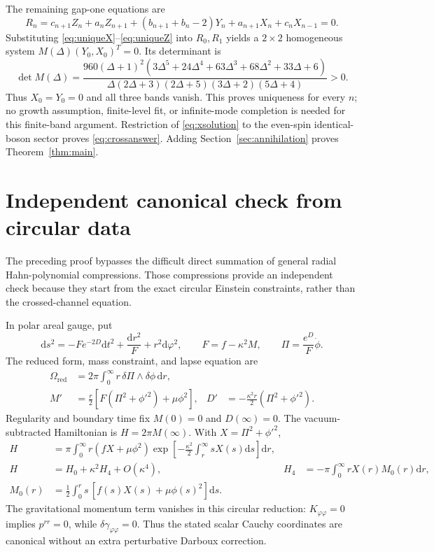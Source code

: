 \documentclass[11pt,a4paper]{article}
\numberwithin{equation}{section}
\theoremstyle{remark}\newtheorem{remark}[theorem]{Remark}
\newcommand{\dd}{\mathrm d}
\newcommand{\kap}{\kappa}
\begin{document}
The remaining gap-one equations are
\begin{equation}
 R_n=c_{n+1}Z_n+a_nZ_{n+1}+(b_{n+1}+b_n-2)Y_n
 +a_{n+1}X_n+c_nX_{n-1}=0.
 \label{eq:uniqueR}
\end{equation}
Substituting \eqref{eq:uniqueX}--\eqref{eq:uniqueZ} into $R_0,R_1$ yields a $2\times2$ homogeneous system $M(\Delta)(Y_0,X_0)^T=0$. Its determinant is
\begin{equation}
 \boxed{\det M(\Delta)=
 \frac{960(\Delta+1)^2
 (3\Delta^5+24\Delta^4+63\Delta^3+68\Delta^2+33\Delta+6)}
 {\Delta(2\Delta+3)(2\Delta+5)(3\Delta+2)(5\Delta+4)}>0.}
 \label{eq:det}
\end{equation}
Thus $X_0=Y_0=0$ and all three bands vanish. This proves uniqueness for every $n$; no growth assumption, finite-level fit, or infinite-mode completion is needed for this finite-band argument. Restriction of \eqref{eq:xsolution} to the even-spin identical-boson sector proves \eqref{eq:crossanswer}. Adding Section~\ref{sec:annihilation} proves Theorem~\ref{thm:main}.

\section{Independent canonical check from circular data}
\label{sec:circular}

The preceding proof bypasses the difficult direct summation of general radial Hahn-polynomial compressions. Those compressions provide an independent check because they start from the exact circular Einstein constraints, rather than the crossed-channel equation.

In polar areal gauge, put
\begin{equation}
 \dd s^2=-Fe^{-2D}\dd t^2+\frac{\dd r^2}{F}+r^2\dd\varphi^2,
 \qquad F=f-\kap^2M,\qquad \Pi=\frac{e^D}{F}\dot\phi.
\end{equation}
The reduced form, mass constraint, and lapse equation are
\begin{align}
 \Omega_{\mathrm{red}}&=2\pi\int_0^\infty r\,\delta\Pi\wedge\delta\phi\,\dd r,\\
 M'&=\frac r2\left[F(\Pi^2+\phi'^2)+\mu\phi^2\right],&
 D'&=-\frac{\kap^2r}{2}(\Pi^2+\phi'^2).
\end{align}
Regularity and boundary time fix $M(0)=0$ and $D(\infty)=0$. The vacuum-subtracted Hamiltonian is $H=2\pi M(\infty)$. With $X=\Pi^2+\phi'^2$,
\begin{align}
 H&=\pi\int_0^\infty\!r(fX+\mu\phi^2)
 \exp\!\left[-\frac{\kap^2}{2}\int_r^\infty\!sX(s)\dd s\right]\dd r,\\
 H&=H_0+\kap^2H_4+O(\kap^4),&
 H_4&=-\pi\int_0^\infty rX(r)M_0(r)\dd r,\label{eq:H4}\\
 M_0(r)&=\frac12\int_0^r s\,[f(s)X(s)+\mu\phi(s)^2]\dd s.
\end{align}
The gravitational momentum term vanishes in this circular reduction: $K_{\varphi\varphi}=0$ implies $p^{rr}=0$, while $\delta\gamma_{\varphi\varphi}=0$. Thus the stated scalar Cauchy coordinates are canonical without an extra perturbative Darboux correction.
\end{document}
